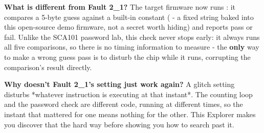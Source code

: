 \documentclass[11pt,letterpaper]{article}
\begin{document}
\vspace{4pt}


\guidelegend

\vspace{4pt}


\clearpage

\tableofcontents

\clearpage


\textbf{What is different from Fault 2\_1?} The target firmware now runs : it compares a 5-byte guess
against a built-in constant ( - a fixed string baked into this open-source
demo firmware, not a secret worth hiding) and reports pass or fail. Unlike the SCA101 password lab, this check never
stops early: it always runs all five comparisons, so there is no timing information to measure - the \textbf{only} way
to make a wrong guess pass is to disturb the chip while it runs, corrupting the comparison's result directly.

\textbf{Why doesn't Fault 2\_1's setting just work again?} A glitch setting disturbs *whatever instruction is
executing at that instant*. The counting loop and the password check are different code, running at different times,
so the instant that mattered for one means nothing for the other. This Explorer makes you discover that the hard way
before showing you how to search past it.

\end{document}
